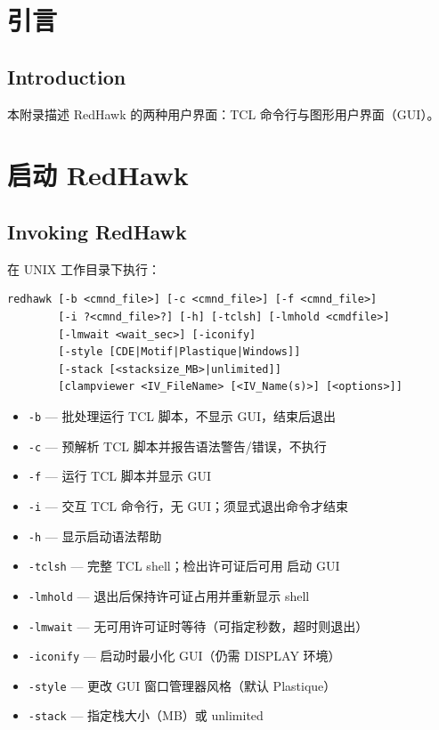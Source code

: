 \label{chap:cmd}

\section{引言}
\subsection*{Introduction}

本附录描述 RedHawk 的两种用户界面：TCL 命令行与图形用户界面（GUI）。

\section{启动 RedHawk}
\subsection*{Invoking RedHawk}

在 UNIX 工作目录下执行：
\begin{lstlisting}
redhawk [-b <cmnd_file>] [-c <cmnd_file>] [-f <cmnd_file>]
        [-i ?<cmnd_file>?] [-h] [-tclsh] [-lmhold <cmdfile>]
        [-lmwait <wait_sec>] [-iconify]
        [-style [CDE|Motif|Plastique|Windows]]
        [-stack [<stacksize_MB>|unlimited]]
        [clampviewer <IV_FileName> [<IV_Name(s)>] [<options>]]
\end{lstlisting}

\begin{itemize}
\item \texttt{-b} — 批处理运行 TCL 脚本，不显示 GUI，结束后退出
\item \texttt{-c} — 预解析 TCL 脚本并报告语法警告/错误，不执行
\item \texttt{-f} — 运行 TCL 脚本并显示 GUI
\item \texttt{-i} — 交互 TCL 命令行，无 GUI；须显式退出命令才结束
\item \texttt{-h} — 显示启动语法帮助
\item \texttt{-tclsh} — 完整 TCL shell；检出许可证后可用  启动 GUI
\item \texttt{-lmhold} — 退出后保持许可证占用并重新显示 shell
\item \texttt{-lmwait} — 无可用许可证时等待（可指定秒数，超时则退出）
\item \texttt{-iconify} — 启动时最小化 GUI（仍需 DISPLAY 环境）
\item \texttt{-style} — 更改 GUI 窗口管理器风格（默认 Plastique）
\item \texttt{-stack} — 指定栈大小（MB）或 unlimited
\end{itemize}


